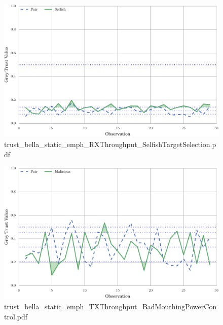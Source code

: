 \documentclass{article}
\begin{document}
\begin{figure}[h!]
\centering
\includegraphics[width=\linewidth]{trust_bella_static_emph_RXThroughput_SelfishTargetSelection.pdf}
\caption{trust\_bella\_static\_emph\_RXThroughput\_SelfishTargetSelection.pdf}
\end{figure}




\begin{figure}[h!]
\centering
\includegraphics[width=\linewidth]{trust_bella_static_emph_TXThroughput_BadMouthingPowerControl.pdf}
\caption{trust\_bella\_static\_emph\_TXThroughput\_BadMouthingPowerControl.pdf}
\end{figure}
\end{document}
